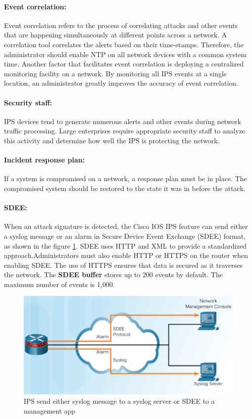 \paragraph{Event correlation:} Event correlation refers to the process of correlating attacks and other events that are happening simultaneously at different points across a network. A correlation tool correlates the alerts based on their time-stamps. Therefore, the administrator should enable NTP on all network devices with a common system time. Another factor that facilitates event correlation is deploying a centralized monitoring facility on a network. By monitoring all IPS events at a single location, an administrator greatly improves the accuracy of event correlation.

\paragraph{Security staff:} IPS devices tend to generate numerous alerts and other events during network traffic processing. Large enterprises require appropriate security staff to analyze this activity and determine how well the IPS is protecting the network. 

\paragraph{Incident response plan:} If a system is compromised on a network, a response plan must be in place. The compromised system should be restored to the state it was in before the attack. 

\paragraph{SDEE:} When an attack signature is detected, the Cisco IOS IPS feature can send either a syslog message or an alarm in Secure Device Event Exchange (SDEE) format, as shown in the figure \ref{SDEE}. SDEE uses HTTP and XML to provide a standardized approach.Administrators must also enable HTTP or HTTPS on the router when enabling SDEE. The use of HTTPS ensures that data is secured as it traverses the network. The \textbf{SDEE buffer} stores up to 200 events by default. The maximum number of events is 1,000.

\begin{figure}[hbtp]
\caption{IPS send either syslog message to a syslog server or SDEE to a management app}\label{SDEE}
\centering
\includegraphics[scale=0.7]{pictures/SDEE.PNG}
\end{figure}



